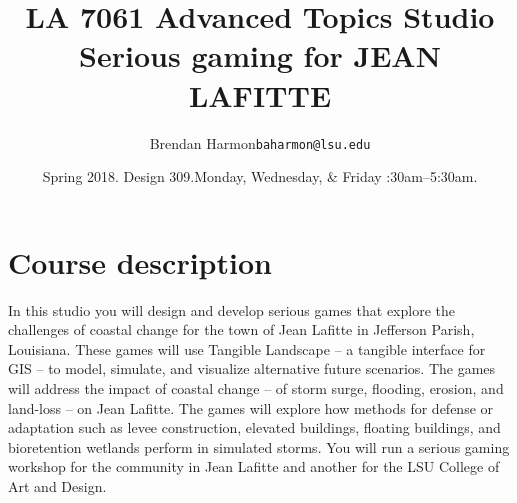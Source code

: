 \documentclass[11pt,article,oneside]{memoir}
\makeatletter
\def\myauthor{Author}
\def\mytitle{Title}
\def\mysubtitle{}
\def\myemail{baharmon@lsu.edu}
\def\myauthor{Brendan Harmon}
\def\mytitle{{\normalsize \textsc{LA} 7061 \newline \newline} \Large \bfseries Advanced Topics Studio \newline}
\def\mysubtitle{\large Serious gaming \newline \newline \tiny for \bfseries JEAN LAFITTE}
\newcommand{\globalcolor}[1]{%
  \color{#1}\global\let\default@color\current@color
}
\makeatother
\begin{document}
\setlength\bibitemsep{0.75em}

\setmainfont[Scale=1, Path = fonts/lato/,BoldItalicFont=Lato-RegIta,BoldFont=Lato-Reg,ItalicFont=Lato-LigIta]{Lato-Lig}
\setsansfont[Scale=1, Path = fonts/lato/,BoldItalicFont=Lato-RegIta,BoldFont=Lato-Reg,ItalicFont=Lato-LigIta]{Lato-Lig}
\setmonofont[Mapping=tex-text,Scale=0.8,Path = fonts/inconsolata/]{i}

\def\ind{\hangindent=1 true cm\hangafter=1 \noindent}
\def\labelitemi{$\cdot$}
\title{\LARGE \mytitle \newline \mysubtitle}     
\author{\large\myauthor \newline \footnotesize\texttt{\noindent\myemail}}
\date{\normalsize Spring 2018. Design 309.\newline Monday, Wednesday, \& Friday :30am--5:30am.}
\published{\,}


\globalcolor{black}
\vspace*{-10em}
\maketitle
\setlength{\wpXoffset}{-4em}
\vfill
\clearpage


\globalcolor{black}
\vspace*{-10em}
\maketitle

\section{Course description}
%
In this studio you will design and develop serious games
that explore the challenges of coastal change
for the town of Jean Lafitte in Jefferson Parish, Louisiana.   
%
These games will use Tangible Landscape
-- a tangible interface for GIS -- 
to model, simulate, and visualize alternative future scenarios. 
%
The games will address the impact of coastal change 
-- of storm surge, flooding, erosion, and land-loss --
on Jean Lafitte. 
%
The games will explore how methods for defense or adaptation 
such as levee construction, elevated buildings, floating buildings, 
and bioretention wetlands 
perform in simulated storms. 
%
You will  run a serious gaming workshop
for the community in Jean Lafitte
and another for the LSU College of Art and Design. 
\end{document}
